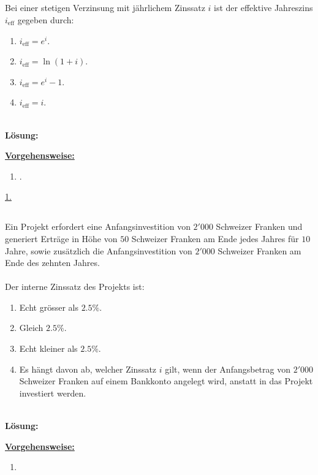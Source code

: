\subsection*{}
Bei einer stetigen Verzinsung mit jährlichem Zinssatz $i$ ist der effektive Jahreszins $i_{\mathrm{eff}}$ gegeben durch:
\renewcommand{\labelenumi}{(\alph{enumi})}
\begin{enumerate}
	\item 
	$i_{\mathrm{eff}} = e^i$.
	\item
	$i_{\mathrm{eff}} = \ln(1+ i)$.
	\item
	$i_{\mathrm{eff}} = e^i -1$.
	\item
	$i_{\mathrm{eff}} = i$.
\end{enumerate}
\ \\
\textbf{Lösung:}
\begin{mdframed}
\underline{\textbf{Vorgehensweise:}}
\renewcommand{\labelenumi}{\theenumi.}
\begin{enumerate}
\item .
\end{enumerate}
\end{mdframed}

\underline{1. }\\


\newpage
\subsection*{}
Ein Projekt erfordert eine Anfangsinvestition von $2'000$ Schweizer Franken und generiert Erträge in Höhe von $50$ Schweizer Franken am Ende jedes Jahres für $10$ Jahre, sowie zusätzlich die Anfangsinvestition von $2'000$ Schweizer Franken am Ende des zehnten Jahres.\\
\\
Der interne Zinssatz des Projekts ist:
\renewcommand{\labelenumi}{(\alph{enumi})}
\begin{enumerate}
	\item 
	Echt grösser als $2.5 \%$.
	\item 
	Gleich $2.5 \%$.
	\item
	Echt kleiner als $2.5 \%$.
	\item
	Es hängt davon ab, welcher Zinssatz $i$ gilt, wenn der Anfangsbetrag von $2'000$ Schweizer Franken auf einem Bankkonto angelegt wird, anstatt in das Projekt investiert werden.
\end{enumerate}
\ \\
\textbf{Lösung:}
\begin{mdframed}
\underline{\textbf{Vorgehensweise:}}
\renewcommand{\labelenumi}{\theenumi.}
\begin{enumerate}
\item 
\end{enumerate}
\end{mdframed}

